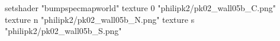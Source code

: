 setshader "bumpspecmapworld"
    texture 0 "philipk2/pk02_wall05b_C.png"
    texture n "philipk2/pk02_wall05b_N.png"
    texture s "philipk2/pk02_wall05b_S.png"
